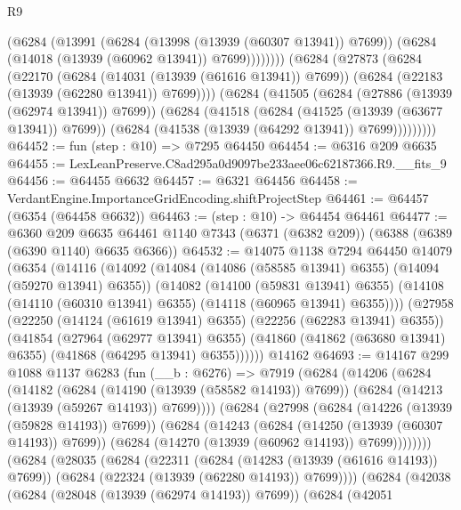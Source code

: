\begin{lexlean}{R9}
\begin{coremodule}
              (@6284
                (@13991
                  (@6284 (@13998 (@13939 (@60307 @13941)) @7699))
                  (@6284 (@14018 (@13939 (@60962 @13941)) @7699))))))))
      (@6284
        (@27873
          (@6284
            (@22170
              (@6284 (@14031 (@13939 (@61616 @13941)) @7699))
              (@6284 (@22183 (@13939 (@62280 @13941)) @7699))))
          (@6284
            (@41505
              (@6284 (@27886 (@13939 (@62974 @13941)) @7699))
              (@6284
                (@41518
                  (@6284 (@41525 (@13939 (@63677 @13941)) @7699))
                  (@6284 (@41538 (@13939 (@64292 @13941)) @7699)))))))))
@64452 := fun (step : @10) => @7295 @64450
@64454 := @6316 @209 @6635
@64455 := LexLeanPreserve.C8ad295a0d9097be233aee06c62187366.R9.__fits_9
@64456 := @64455 @6632
@64457 := @6321 @64456
@64458 := VerdantEngine.ImportanceGridEncoding.shiftProjectStep
@64461 := @64457 (@6354 (@64458 @6632))
@64463 := (step : @10) -> @64454 @64461
@64477 := @6360
    @209
    @6635
    @64461
    @1140
    @7343
    (@6371 (@6382 @209))
    (@6388 (@6389 (@6390 @1140) @6635 @6366))
@64532 := @14075
    @1138
    @7294
    @64450
    @14079
    (@6354
      (@14116
        (@14092
          (@14084 (@14086 (@58585 @13941) @6355) (@14094 (@59270 @13941) @6355))
          (@14082
            (@14100 (@59831 @13941) @6355)
            (@14108 (@14110 (@60310 @13941) @6355) (@14118 (@60965 @13941) @6355))))
        (@27958
          (@22250 (@14124 (@61619 @13941) @6355) (@22256 (@62283 @13941) @6355))
          (@41854
            (@27964 (@62977 @13941) @6355)
            (@41860 (@41862 (@63680 @13941) @6355) (@41868 (@64295 @13941) @6355))))))
    @14162
@64693 := @14167
    @299
    @1088
    @1137
    @6283
    (fun (__b : @6276) =>
    @7919
      (@6284
        (@14206
          (@6284
            (@14182
              (@6284 (@14190 (@13939 (@58582 @14193)) @7699))
              (@6284 (@14213 (@13939 (@59267 @14193)) @7699))))
          (@6284
            (@27998
              (@6284 (@14226 (@13939 (@59828 @14193)) @7699))
              (@6284
                (@14243
                  (@6284 (@14250 (@13939 (@60307 @14193)) @7699))
                  (@6284 (@14270 (@13939 (@60962 @14193)) @7699))))))))
      (@6284
        (@28035
          (@6284
            (@22311
              (@6284 (@14283 (@13939 (@61616 @14193)) @7699))
              (@6284 (@22324 (@13939 (@62280 @14193)) @7699))))
          (@6284
            (@42038
              (@6284 (@28048 (@13939 (@62974 @14193)) @7699))
              (@6284
                (@42051

\end{coremodule}
\end{lexlean}
